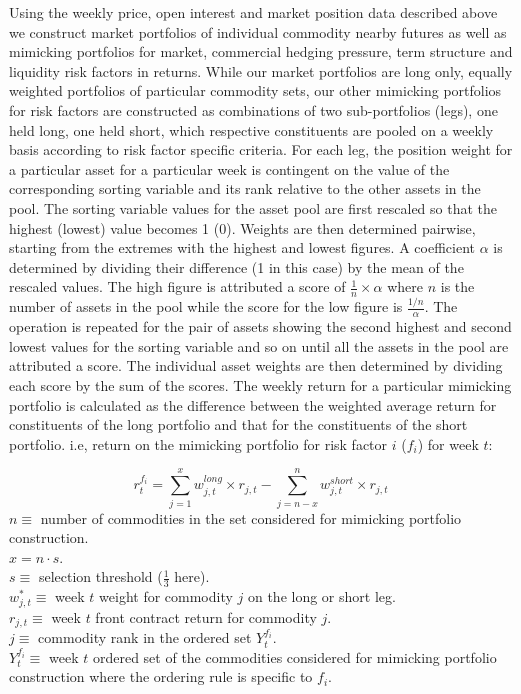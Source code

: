 \documentclass[]{elsarticle} %
\begin{document}
Using the weekly price, open interest and market position data described above we construct market portfolios of individual commodity nearby futures as well as mimicking portfolios for market, commercial hedging pressure, term structure and liquidity risk factors in returns. While our market portfolios are long only, equally weighted portfolios of particular commodity sets, our other mimicking portfolios for risk factors are constructed as combinations of two sub-portfolios (legs), one held long, one held short, which respective constituents are pooled on a weekly basis according to risk factor specific criteria. For each leg, the position weight for a particular asset for a particular week is contingent on the value of the corresponding sorting variable and its rank relative to the other assets in the pool. The sorting variable values for the asset pool are first rescaled so that the highest (lowest) value becomes 1 (0). Weights are then determined pairwise, starting from the extremes with the highest and lowest figures. A coefficient \(\alpha\) is determined by dividing their difference (1 in this case) by the mean of the rescaled values. The high figure is attributed a score of \(\frac{1}{n} \times \alpha\) where \(n\) is the number of assets in the pool while the score for the low figure is \(\frac{1/n}{\alpha}\). The operation is repeated for the pair of assets showing the second highest and second lowest values for the sorting variable and so on until all the assets in the pool are attributed a score. The individual asset weights are then determined by dividing each score by the sum of the scores. The weekly return for a particular mimicking portfolio is calculated as the difference between the weighted average return for constituents of the long portfolio and that for the constituents of the short portfolio. i.e, return on the mimicking portfolio for risk factor \(i\) (\(f_{i}\)) for week \(t\):

\[r_{t}^{f_{i}}=\sum_{j=1}^{x}w^{long}_{j,t} \times r_{j,t}-\sum_{j=n-x}^{n}w^{short}_{j,t} \times r_{j,t}\]
\(n\equiv\) number of commodities in the set considered for mimicking portfolio construction.\\
\(x = n \cdot s\).\\
\(s\equiv\) selection threshold (\(\frac{1}{3}\) here).\\
\(w^{*}_{j,t}\equiv\) week \(t\) weight for commodity \(j\) on the long or short leg.\\
\(r_{j,t}\equiv\) week \(t\) front contract return for commodity \(j\).\\
\(j\equiv\) commodity rank in the ordered set \(Y_{t}^{f_{i}}\).\\
\(Y_{t}^{f_{i}}\equiv\) week \(t\) ordered set of the commodities considered for mimicking portfolio construction where the ordering rule is specific to \(f_{i}\).
\end{document}
